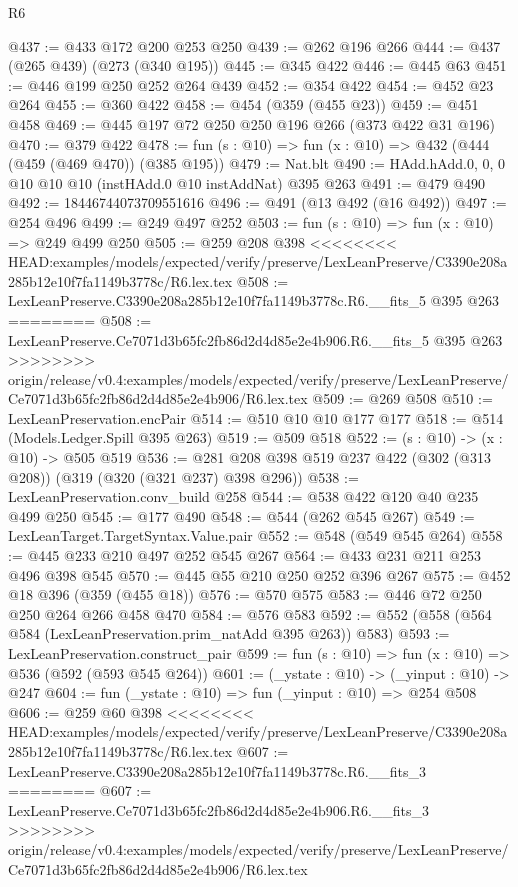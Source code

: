 \begin{lexlean}{R6}
\begin{coremodule}
{{{{{{{{{{{{{{{@437 := @433 @172 @200 @253 @250
@439 := @262 @196 @266
@444 := @437 (@265 @439) (@273 (@340 @195))
@445 := @345 @422
@446 := @445 @63
@451 := @446 @199 @250 @252 @264 @439
@452 := @354 @422
@454 := @452 @23 @264
@455 := @360 @422
@458 := @454 (@359 (@455 @23))
@459 := @451 @458
@469 := @445 @197 @72 @250 @250 @196 @266 (@373 @422 @31 @196)
@470 := @379 @422
@478 := fun (s : @10) => fun (x : @10) => @432 (@444 (@459 (@469 @470)) (@385 @195))
@479 := Nat.blt
@490 := HAdd.hAdd.{0, 0, 0} @10 @10 @10 (instHAdd.{0} @10 instAddNat) @395 @263
@491 := @479 @490
@492 := 18446744073709551616
@496 := @491 (@13 @492 (@16 @492))
@497 := @254 @496
@499 := @249 @497 @252
@503 := fun (s : @10) => fun (x : @10) => @249 @499 @250
@505 := @259 @208 @398
<<<<<<<< HEAD:examples/models/expected/verify/preserve/LexLeanPreserve/C3390e208a285b12e10f7fa1149b3778c/R6.lex.tex
@508 := LexLeanPreserve.C3390e208a285b12e10f7fa1149b3778c.R6.__fits_5 @395 @263
========
@508 := LexLeanPreserve.Ce7071d3b65fc2fb86d2d4d85e2e4b906.R6.__fits_5 @395 @263
>>>>>>>> origin/release/v0.4:examples/models/expected/verify/preserve/LexLeanPreserve/Ce7071d3b65fc2fb86d2d4d85e2e4b906/R6.lex.tex
@509 := @269 @508
@510 := LexLeanPreservation.encPair
@514 := @510 @10 @10 @177 @177
@518 := @514 (Models.Ledger.Spill @395 @263)
@519 := @509 @518
@522 := (s : @10) -> (x : @10) -> @505 @519
@536 := @281 @208 @398 @519 @237 @422 (@302 (@313 @208)) (@319 (@320 (@321 @237) @398 @296))
@538 := LexLeanPreservation.conv_build @258
@544 := @538 @422 @120 @40 @235 @499 @250
@545 := @177 @490
@548 := @544 (@262 @545 @267)
@549 := LexLeanTarget.TargetSyntax.Value.pair
@552 := @548 (@549 @545 @264)
@558 := @445 @233 @210 @497 @252 @545 @267
@564 := @433 @231 @211 @253 @496 @398 @545
@570 := @445 @55 @210 @250 @252 @396 @267
@575 := @452 @18 @396 (@359 (@455 @18))
@576 := @570 @575
@583 := @446 @72 @250 @250 @264 @266 @458 @470
@584 := @576 @583
@592 := @552 (@558 (@564 @584 (LexLeanPreservation.prim_natAdd @395 @263)) @583)
@593 := LexLeanPreservation.construct_pair
@599 := fun (s : @10) => fun (x : @10) => @536 (@592 (@593 @545 @264))
@601 := (_ystate : @10) -> (_yinput : @10) -> @247
@604 := fun (_ystate : @10) => fun (_yinput : @10) => @254 @508
@606 := @259 @60 @398
<<<<<<<< HEAD:examples/models/expected/verify/preserve/LexLeanPreserve/C3390e208a285b12e10f7fa1149b3778c/R6.lex.tex
@607 := LexLeanPreserve.C3390e208a285b12e10f7fa1149b3778c.R6.__fits_3
========
@607 := LexLeanPreserve.Ce7071d3b65fc2fb86d2d4d85e2e4b906.R6.__fits_3
>>>>>>>> origin/release/v0.4:examples/models/expected/verify/preserve/LexLeanPreserve/Ce7071d3b65fc2fb86d2d4d85e2e4b906/R6.lex.tex
}}}}}}}}}}}}}}}
\end{coremodule}
\end{lexlean}
